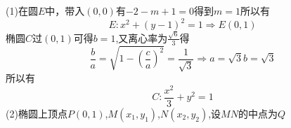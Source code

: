 (1)在圆$E$中，带入$(0,0)$有$-2-m+1=0$得到$m=1$所以有
\begin{equation}
E:{x^2} + {\left( {y - 1} \right)^2} = 1 \Rightarrow E\left( {0,1} \right)
\end{equation}
椭圆$C$过$(0,1)$可得$b=1$,又离心率为$\frac{{\sqrt 6 }}{3}$得
\begin{equation}
\frac{b}{a} = \sqrt {1 - {{\left( {\frac{c}{a}} \right)}^2}}  = \frac{1}{{\sqrt 3 }} \Rightarrow a = \sqrt 3 b = \sqrt 3
\end{equation}
所以有
\begin{equation}
C:\frac{{{x^2}}}{3} + {y^2} = 1
\end{equation}
(2)椭圆上顶点$P(0,1)$,$M\left( {{x_1},{y_1}} \right)$,$N\left( {{x_2},{y_2}} \right)$,设$MN$的中点为$Q$
